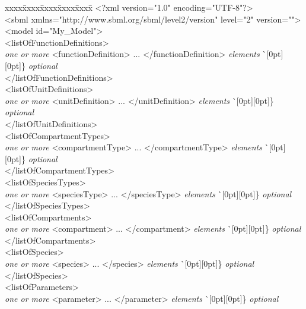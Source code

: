 \newcommand{\sayOptional}{\raisebox{0pt}[0pt][0pt]{\bigg\} \textrm{\emph{optional}}}}

\vspace*{1.5ex}
\begin{tt}
  \tightspacing
  \small
  \begin{tabbing}
xxxx\=xxxx\=xxxx\=xxxx\=xxxx\=\kill
\+\>
<?xml version="1.0" encoding="UTF-8"?>\\
<sbml xmlns="http://www.sbml.org/sbml/level2/version" level="2" version="">\\
\><model id="My\_Model">\\
\>\><listOfFunctionDefinitions>\\
\>\>\>\textrm{\emph{one or more}} <functionDefinition> ... </functionDefinition> \textrm{\emph{elements}}  \` \sayOptional\\
\>\></listOfFunctionDefinitions>\\
\>\><listOfUnitDefinitions>\\
\>\>\>\textrm{\emph{one or more}} <unitDefinition> ... </unitDefinition> \textrm{\emph{elements}}  \` \sayOptional\\
\>\></listOfUnitDefinitions>\\
\>\><listOfCompartmentTypes>\\
\>\>\>\textrm{\emph{one or more}} <compartmentType> ... </compartmentType> \textrm{\emph{elements}}  \` \sayOptional\\
\>\></listOfCompartmentTypes>\\
\>\><listOfSpeciesTypes>\\
\>\>\>\textrm{\emph{one or more}} <speciesType> ... </speciesType> \textrm{\emph{elements}}  \` \sayOptional\\
\>\></listOfSpeciesTypes>\\
\>\><listOfCompartments>\\
\>\>\>\textrm{\emph{one or more}} <compartment> ... </compartment> \textrm{\emph{elements}}  \` \sayOptional\\
\>\></listOfCompartments>\\
\>\><listOfSpecies>\\
\>\>\>\textrm{\emph{one or more}} <species> ... </species> \textrm{\emph{elements}}  \` \sayOptional\\
\>\></listOfSpecies>\\
\>\><listOfParameters>\\
\>\>\>\textrm{\emph{one or more}} <parameter> ... </parameter> \textrm{\emph{elements}}  \` \sayOptional\\

\end{tabbing}
\end{tt}

